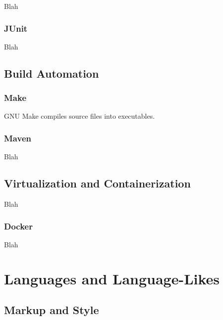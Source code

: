 Blah

\subsubsection{JUnit}

Blah

\subsection{Build Automation}

\subsubsection{Make}

GNU Make compiles source files into executables.



\subsubsection{Maven}

Blah


\subsection{Virtualization and Containerization}

Blah

\subsubsection{Docker}

Blah


\toclineskip
\section{Languages and Language-Likes}


\subsection{Markup and Style}

